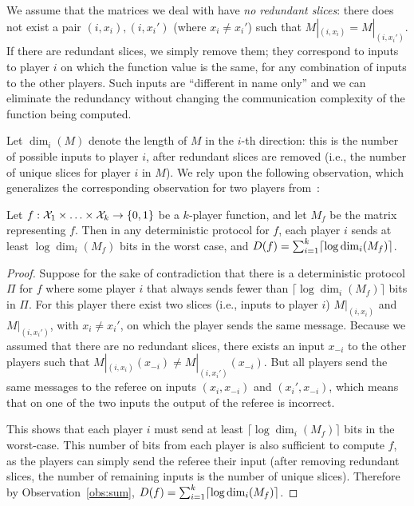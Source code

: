 We assume that the matrices we deal with have \emph{no redundant slices}: there does not exist a pair $(i,x_i), (i,x_i')$ (where $x_i \neq x_i'$) such that
$M|_{(i,x_i)} = M|_{(i,x_i')}$. If there are redundant slices, we simply remove them; they correspond to inputs to player $i$ on which
the function value is the same, for any combination of inputs to the other players. Such inputs are ``different in name only'' and we can eliminate the redundancy without changing the communication complexity of the function being computed.


Let $\dim_i(M)$ denote the length of $M$ in the $i$-th direction: this is the number of possible inputs to player $i$, after redundant slices are removed (i.e., the number of unique slices for player $i$ in $M$).
We rely upon the following observation, which generalizes the corresponding observation for two players from~\cite{BK97}:

\begin{observation}
	Let $f : \mathcal{X}_1 \times \ldots \times \mathcal{X}_k \rightarrow \{ 0,1 \}$ be a $k$-player function,
	and let $M_f$ be the matrix representing $f$.
Then
in any deterministic protocol for $f$, each player $i$ sends at least $\log \dim_i(M_f)$ bits in the worst case,
and
$D(f) = \sum_{i=1}^k \lceil \log \dim_i(M_f)\rceil$.
\label{obs:det}
\end{observation}

\begin{proof}
	Suppose for the sake of contradiction that there is a deterministic protocol $\Pi$ for $f$
where some player $i$ that always sends fewer than $\lceil \log \dim_i(M_f)\rceil$ bits in $\Pi$.
For this player there exist two slices (i.e., inputs to player $i$)
	$M|_{(i,x_i)}$ and $M|_{(i,x_i')}$, with $x_i \neq x_i'$, on which the player sends the same message.
	Because we assumed that there are no redundant slices, 
	there exists an input $x_{-i}$ to the other players such that $M|_{(i,x_i)}(x_{-i}) \neq M|_{(i,x_i')}(x_{-i})$.
	But all players send the same messages to the referee on inputs $(x_i, x_{-i})$ and $(x_i', x_{-i})$,
	which means that on one of the two inputs the output of the referee is incorrect.

	This shows that each player $i$ must send at least $\lceil \log \dim_i(M_f) \rceil$ bits in the worst-case.
	This number of bits from each player is also sufficient to compute $f$,
	as the players can simply send the referee their input (after removing redundant slices,
	the number of remaining inputs is the number of unique slices).
	Therefore by Observation~\ref{obs:sum},
	$D(f) = \sum_{i=1}^k \lceil \log \dim_i(M_f) \rceil$.
\end{proof}


